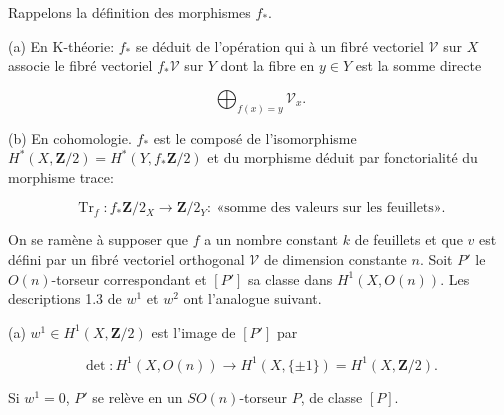 \documentclass[9pt,twoside]{extarticle}
\begin{document}
{Rappelons la définition des morphismes \(f_*\).\par

(a) En K-théorie: \(f_*\) se déduit de l’opération qui à un fibré vectoriel \(\mathcal V\) sur \(X\) associe le fibré vectoriel \(f_*\mathcal V\) sur \(Y\) dont la fibre en \(y\in Y\) est la somme directe\par

\[
\bigoplus_{f(x)=y}\mathcal V_x.
\]

(b) En cohomologie. \(f_*\) est le composé de l’isomorphisme \(H^*(X,\mathbf Z/2)=H^*(Y,f_*\mathbf Z/2)\) et du morphisme déduit par fonctorialité du morphisme trace:\par

\[
\operatorname{Tr}_f:f_*\mathbf Z/2_X\longrightarrow\mathbf Z/2_Y:\ \text{«somme des valeurs sur les feuillets»}.
\]

On se ramène à supposer que \(f\) a un nombre constant \(k\) de feuillets et que \(v\) est défini par un fibré vectoriel orthogonal \(\mathcal V\) de dimension constante \(n\). Soit \(P'\) le \(O(n)\)-torseur correspondant et \([P']\) sa classe dans \(H^1(X,O(n))\). Les descriptions 1.3 de \(w^1\) et \(w^2\) ont l’analogue suivant.\par

(a) \(w^1\in H^1(X,\mathbf Z/2)\) est l’image de \([P']\) par\par

\[
\det:H^1(X,O(n))\longrightarrow H^1(X,\{\pm1\})=H^1(X,\mathbf Z/2).
\]

Si \(w^1=0\), \(P'\) se relève en un \(SO(n)\)-torseur \(P\), de classe \([P]\).\par
}
\end{document}
